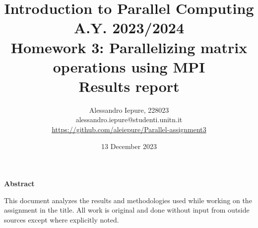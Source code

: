 \documentclass{article}
\begin{document}
    \title{Introduction to Parallel Computing\\%
    A.Y. 2023/2024\\%
    Homework 3: Parallelizing matrix operations using MPI\\%
    \textbf{Results report}}
    \author{%
        Alessandro Iepure, 228023\\%
        alessandro.iepure@studenti.unitn.it\\%
        \url{https://github.com/aleiepure/Parallel-assignment3}
    }
    \date{13 December 2023}
    \maketitle

    \begin{center}
        \textbf{Abstract}
    \end{center}
    This document analyzes the results and methodologies used while working on %
    the assignment in the title. All work is original and done without input %
    from outside sources except where explicitly noted.

    
    \clearpage
    
    
    \nocite{*}
    \printbibliography
\end{document}
